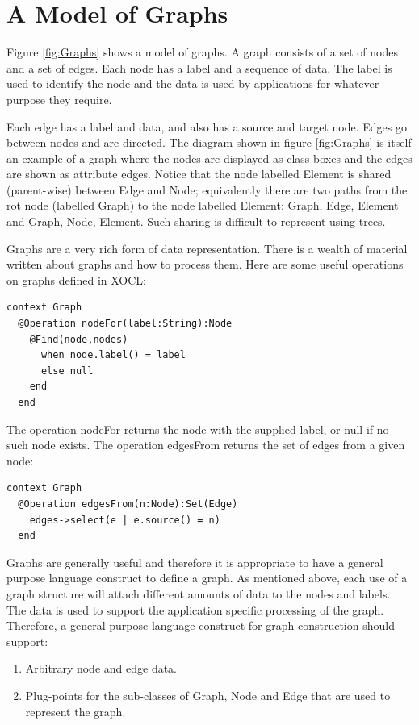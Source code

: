 \section{A Model of Graphs}

Figure \ref{fig:Graphs} shows a model of graphs. A graph consists
of a set of nodes and a set of edges. Each node has a label and a
sequence of data. The label is used to identify the node and the data
is used by applications for whatever purpose they require.

Each edge has a label and data, and also has a source and target node.
Edges go between nodes and are directed. The diagram shown in figure
\ref{fig:Graphs} is itself an example of a graph where the nodes
are displayed as class boxes and the edges are shown as attribute
edges. Notice that the node labelled Element is shared (parent-wise)
between Edge and Node; equivalently there are two paths from the rot
node (labelled Graph) to the node labelled Element: Graph, Edge, Element
and Graph, Node, Element. Such sharing is difficult to represent using
trees.

Graphs are a very rich form of data representation. There is a wealth
of material written about graphs and how to process them. Here are
some useful operations on graphs defined in XOCL:

\begin{lstlisting}
context Graph
  @Operation nodeFor(label:String):Node
    @Find(node,nodes)
      when node.label() = label
      else null
    end
  end
\end{lstlisting}The operation nodeFor returns the node with the supplied label, or
null if no such node exists. The operation edgesFrom returns the set
of edges from a given node:

\begin{lstlisting}
context Graph
  @Operation edgesFrom(n:Node):Set(Edge)
    edges->select(e | e.source() = n)
  end
\end{lstlisting}Graphs are generally useful and therefore it is appropriate to have
a general purpose language construct to define a graph. As mentioned
above, each use of a graph structure will attach different amounts
of data to the nodes and labels. The data is used to support the application
specific processing of the graph. Therefore, a general purpose language
construct for graph construction should support:

\begin{enumerate}
\item Arbitrary node and edge data.
\item Plug-points for the sub-classes of Graph, Node and Edge that are used
to represent the graph.
\end{enumerate}

